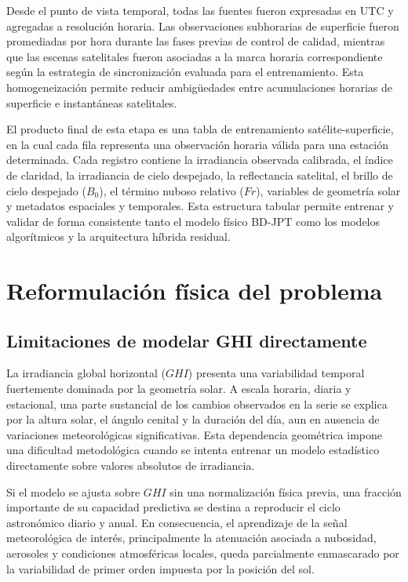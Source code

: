 \documentclass[../main.tex]{subfiles}
\begin{document}
Desde el punto de vista temporal, todas las fuentes fueron expresadas en UTC y agregadas a resolución horaria. Las observaciones subhorarias de superficie fueron promediadas por hora durante las fases previas de control de calidad, mientras que las escenas satelitales fueron asociadas a la marca horaria correspondiente según la estrategia de sincronización evaluada para el entrenamiento. Esta homogeneización permite reducir ambigüedades entre acumulaciones horarias de superficie e instantáneas satelitales.

El producto final de esta etapa es una tabla de entrenamiento satélite-superficie, en la cual cada fila representa una observación horaria válida para una estación determinada. Cada registro contiene la irradiancia observada calibrada, el índice de claridad, la irradiancia de cielo despejado, la reflectancia satelital, el brillo de cielo despejado ($B_0$), el término nuboso relativo ($Fr$), variables de geometría solar y metadatos espaciales y temporales. Esta estructura tabular permite entrenar y validar de forma consistente tanto el modelo físico BD-JPT como los modelos algorítmicos y la arquitectura híbrida residual.


\section{Reformulación física del problema}

\subsection{Limitaciones de modelar GHI directamente}

La irradiancia global horizontal ($GHI$) presenta una variabilidad temporal fuertemente dominada por la geometría solar. A escala horaria, diaria y estacional, una parte sustancial de los cambios observados en la serie se explica por la altura solar, el ángulo cenital y la duración del día, aun en ausencia de variaciones meteorológicas significativas. Esta dependencia geométrica impone una dificultad metodológica cuando se intenta entrenar un modelo estadístico directamente sobre valores absolutos de irradiancia.

Si el modelo se ajusta sobre $GHI$ sin una normalización física previa, una fracción importante de su capacidad predictiva se destina a reproducir el ciclo astronómico diario y anual. En consecuencia, el aprendizaje de la señal meteorológica de interés, principalmente la atenuación asociada a nubosidad, aerosoles y condiciones atmosféricas locales, queda parcialmente enmascarado por la variabilidad de primer orden impuesta por la posición del sol.
\end{document}
